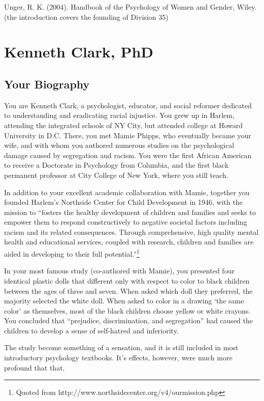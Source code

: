 \begin{refsection}
Unger, R. K. (2004). Handbook of the Psychology of Women and Gender, Wiley. (the introduction covers the founding of Division 35)

\chapter{Kenneth Clark, PhD}
\label{kennethclarkphd}

\section{Your Biography}
\label{yourbiography}

You are Kenneth Clark, a psychologist, educator, and social reformer dedicated to understanding and eradicating racial injustice. You grew up in Harlem, attending the integrated schools of NY City, but attended college at Howard University in D.C. There, you met Mamie Phipps, who eventually became your wife, and with whom you authored numerous studies on the psychological damage caused by segregation and racism. You were the first African American to receive a Doctorate in Psychology from Columbia, and the first black permanent professor at City College of New York, where you still teach.

In addition to your excellent academic collaboration with Mamie, together you founded Harlem's Northside Center for Child Development in 1946, with the mission to “fosters the healthy development of children and families and seeks to empower them to respond constructively to negative societal factors including racism and its related consequences. Through comprehensive, high quality mental health and educational services, coupled with research, children and families are aided in developing to their full potential.”\footnote{Quoted from http:\slash \slash www.northsidecenter.org\slash v4\slash ourmission.php}

In your most famous study (co-authored with Mamie), you presented four identical plastic dolls that different only with respect to color to black children between the ages of three and seven. When asked which doll they preferred, the majority selected the white doll. When asked to color in a drawing `the same color' as themselves, most of the black children choose yellow or white crayons. You concluded that “prejudice, discrimination, and segregation” had caused the children to develop a sense of self-hatred and inferiority.

The study become something of a sensation, and it is still included in most introductory psychology textbooks. It's effects, however, were much more profound that that.


\end{refsection}
